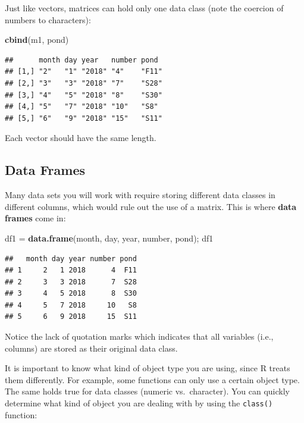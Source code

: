 \documentclass[]{book}
\newenvironment{Shaded}{\begin{snugshade}}{\end{snugshade}}
\newcommand{\KeywordTok}[1]{\textcolor[rgb]{0.13,0.29,0.53}{\textbf{#1}}}
\newcommand{\StringTok}[1]{\textcolor[rgb]{0.31,0.60,0.02}{#1}}
\newcommand{\NormalTok}[1]{#1}
\theoremstyle{definition}
\theoremstyle{definition}
\theoremstyle{definition}
\theoremstyle{remark}
\begin{document}
Just like vectors, matrices can hold only one data class (note the
coercion of numbers to characters):

\begin{Shaded}
\begin{Highlighting}[]
\KeywordTok{cbind}\NormalTok{(m1, pond)}
\end{Highlighting}
\end{Shaded}

\begin{verbatim}
##      month day year   number pond 
## [1,] "2"   "1" "2018" "4"    "F11"
## [2,] "3"   "3" "2018" "7"    "S28"
## [3,] "4"   "5" "2018" "8"    "S30"
## [4,] "5"   "7" "2018" "10"   "S8" 
## [5,] "6"   "9" "2018" "15"   "S11"
\end{verbatim}

Each vector should have the same length.

\subsection{Data Frames}\label{data-frames}

Many data sets you will work with require storing different data classes
in different columns, which would rule out the use of a matrix. This is
where \textbf{data frames} come in:

\begin{Shaded}
\begin{Highlighting}[]
\NormalTok{df1 =}\StringTok{ }\KeywordTok{data.frame}\NormalTok{(month, day, year, number, pond); df1}
\end{Highlighting}
\end{Shaded}

\begin{verbatim}
##   month day year number pond
## 1     2   1 2018      4  F11
## 2     3   3 2018      7  S28
## 3     4   5 2018      8  S30
## 4     5   7 2018     10   S8
## 5     6   9 2018     15  S11
\end{verbatim}

Notice the lack of quotation marks which indicates that all variables
(i.e., columns) are stored as their original data class.

It is important to know what kind of object type you are using, since R
treats them differently. For example, some functions can only use a
certain object type. The same holds true for data classes (numeric
vs.~character). You can quickly determine what kind of object you are
dealing with by using the \texttt{class()} function:
\end{document}
